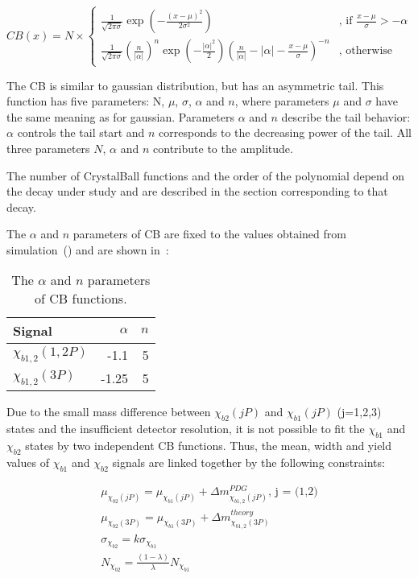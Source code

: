 \begin{equation}
CB(x) = N \times
\begin{cases}
\frac{1}{\sqrt{2\pi\sigma}}\exp(-\frac{{(x-\mu)}^2}{2\sigma^2}) & \text{, if $\frac{x-\mu}{\sigma} > -\alpha$} \\
\frac{1}{\sqrt{2\pi\sigma}}{(\frac{n}{|\alpha|})}^n \exp(-\frac{|\alpha|^2}{2}){(\frac{n}{|\alpha|}-|\alpha|-\frac{x-\mu}{\sigma})}^{-n} & \text{, otherwise}
\end{cases}
\label{eq:cb}
\end{equation}

The CB is similar to gaussian distribution, but has an asymmetric tail. This
function has five parameters: N, $\mu$, $\sigma$, $\alpha$ and $n$, where
parameters $\mu$ and $\sigma$ have the same meaning as for gaussian. Parameters
$\alpha$ and $n$ describe the tail behavior: $\alpha$ controls the tail start
and $n$ corresponds to the decreasing power of the tail. All three parameters
$N$, $\alpha$ and $n$ contribute to the amplitude.

The number of CrystalBall functions and the order of the polynomial depend on
the decay under study and are described in the section corresponding to that
decay.


The $\alpha$ and $n$
parameters of CB are fixed to the values obtained from simulation~()
and are shown in~:


\begin{table}[H]
\caption{\small   The $\alpha$ and $n$ parameters of CB functions.}
\centering
\begin{tabular}{lrr}
\toprule
Signal & $\alpha$ & $n$ \\
\midrule
$\chi_{b1,2}(1,2P)$ & -1.1 & 5 \\
$\chi_{b1,2}(3P)$ & -1.25 & 5 \\
\bottomrule
\end{tabular}
\label{tab:chib:fit:tail}
\end{table}

Due to the small mass difference between $\chi_{b2}(jP)$ and $\chi_{b1}(jP)$
(j=1,2,3) states and the insufficient detector resolution, it is not possible
to fit the $\chi_{b1}$ and $\chi_{b2}$ states by two independent CB functions.
Thus, the mean, width and yield values of  $\chi_{b1}$ and $\chi_{b2}$ signals
are linked together by the following constraints:

\begin{equation}
  \begin{aligned}
\mu_{\chi_{b2}(jP)} = \mu_{\chi_{b1}(jP)} + \Delta m_{\chi_{b1,2}(jP)}^{PDG} \text{, j = (1,2)}\\
\mu_{\chi_{b2}(3P)} = \mu_{\chi_{b1}(3P)} + \Delta m_{\chi_{b1,2}(3P)}^{theory} \\
\sigma_{\chi_{b2}} = k \sigma_{\chi_{b1}}\\
N_{\chi_{b2}} = \frac{(1-\lambda)}{\lambda} N_{\chi_{b1}}
  \end{aligned}
\end{equation}


